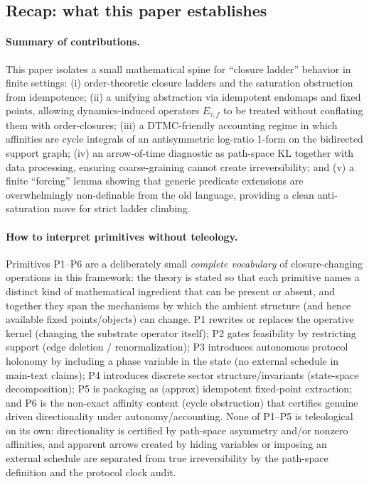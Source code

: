 \documentclass[11pt]{article}
\theoremstyle{remark}
\begin{document}
\subsection*{Recap: what this paper establishes}

\paragraph{Summary of contributions.}
This paper isolates a small mathematical spine for ``closure ladder'' behavior in finite settings:
(i) order-theoretic closure ladders and the saturation obstruction from idempotence;
(ii) a unifying abstraction via idempotent endomaps and fixed points, allowing dynamics-induced operators $E_{\tau,f}$ to be treated without conflating them with order-closures;
(iii) a DTMC-friendly accounting regime in which affinities are cycle integrals of an antisymmetric log-ratio 1-form on the bidirected support graph;
(iv) an arrow-of-time diagnostic as path-space KL together with data processing, ensuring coarse-graining cannot create irreversibility;
and (v) a finite ``forcing'' lemma showing that generic predicate extensions are overwhelmingly non-definable from the old language, providing a clean anti-saturation move for strict ladder climbing.

\paragraph{How to interpret primitives without teleology.}
Primitives P1--P6 are a deliberately small \emph{complete vocabulary} of closure-changing operations in this framework: the theory is stated so that each primitive names a distinct kind of mathematical ingredient that can be present or absent, and together they span the mechanisms by which the ambient structure (and hence available fixed points/objects) can change.
P1 rewrites or replaces the operative kernel (changing the substrate operator itself); P2 gates feasibility by restricting support (edge deletion / renormalization); P3 introduces autonomous protocol holonomy by including a phase variable in the state (no external schedule in main-text claims); P4 introduces discrete sector structure/invariants (state-space decomposition); P5 is packaging as (approx) idempotent fixed-point extraction; and P6 is the non-exact affinity content (cycle obstruction) that certifies genuine driven directionality under autonomy/accounting.
None of P1--P5 is teleological on its own: directionality is certified by path-space asymmetry and/or nonzero affinities, and apparent arrows created by hiding variables or imposing an external schedule are separated from true irreversibility by the path-space definition and the protocol clock audit.
\end{document}
